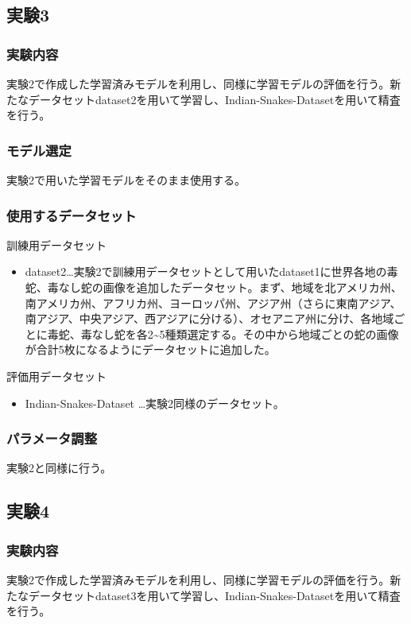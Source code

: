 \documentclass[a4paper, 11pt, titlepage]{jsarticle}
\begin{document}
\subsection{実験3}
\subsubsection{実験内容}
実験2で作成した学習済みモデルを利用し、同様に学習モデルの評価を行う。新たなデータセットdataset2を用いて学習し、Indian-Snakes-Datasetを用いて精査を行う。

\subsubsection{モデル選定}
実験2で用いた学習モデルをそのまま使用する。

\subsubsection{使用するデータセット}
訓練用データセット
\begin{itemize}
\item dataset2…実験2で訓練用データセットとして用いたdataset1に世界各地の毒蛇、毒なし蛇の画像を追加したデータセット。まず、地域を北アメリカ州、南アメリカ州、アフリカ州、ヨーロッパ州、アジア州（さらに東南アジア、南アジア、中央アジア、西アジアに分ける）、オセアニア州に分け、各地域ごとに毒蛇、毒なし蛇を各2\textasciitilde5種類選定する。その中から地域ごとの蛇の画像が合計5枚になるようにデータセットに追加した。
\end{itemize}\par
評価用データセット
\begin{itemize}
\item Indian-Snakes-Dataset …実験2同様のデータセット。
\end{itemize}

\subsubsection{パラメータ調整}
実験2と同様に行う。

\subsection{実験4}
\subsubsection{実験内容}
実験2で作成した学習済みモデルを利用し、同様に学習モデルの評価を行う。新たなデータセットdataset3を用いて学習し、Indian-Snakes-Datasetを用いて精査を行う。
\end{document}
